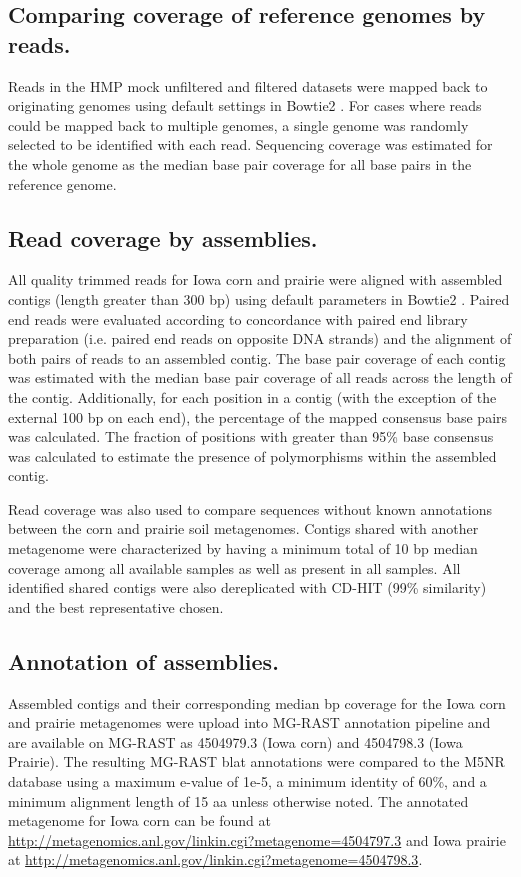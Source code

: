 \documentclass{pnastwo}
\begin{document}
\begin{article}
\subsection*{Comparing coverage of reference genomes by reads.}
Reads in the HMP mock unfiltered and filtered datasets were mapped
back to originating genomes using default settings in Bowtie2
\cite{bowtie}.  For cases where reads could be mapped back to multiple
genomes, a single genome was randomly selected to be identified with
each read.  Sequencing coverage was estimated for the whole genome as
the median base pair coverage for all base pairs in the reference
genome.

\subsection*{Read coverage by assemblies.}
All quality trimmed reads for Iowa corn and prairie were aligned with
assembled contigs (length greater than 300 bp) using default
parameters in Bowtie2 \cite{bowtie}.  Paired end reads were evaluated according to
concordance with paired end library preparation (i.e. paired end reads
on opposite DNA strands) and the alignment of both pairs of reads to
an assembled contig.  The base pair coverage of each contig was
estimated with the median base pair coverage of all reads across the
length of the contig.  Additionally, for each position in a contig
(with the exception of the external 100 bp on each end), the
percentage of the mapped consensus base pairs was calculated.  The
fraction of positions with greater than 95\% base consensus was
calculated to estimate the presence of polymorphisms within the
assembled contig.  

Read coverage was also used to compare sequences without known annotations between the corn and prairie soil metagenomes.  Contigs shared with another metagenome were characterized by 
having a minimum total of 10 bp median coverage among all available samples as well as present in all samples.  All identified shared contigs were also dereplicated with CD-HIT (99\% similarity) and the best representative chosen.

\subsection*{Annotation of assemblies.}
Assembled contigs and their corresponding median bp coverage for the
Iowa corn and prairie metagenomes were upload into MG-RAST annotation
pipeline \cite{Meyer:2008db} and are available on MG-RAST as 4504979.3 (Iowa corn)
and 4504798.3 (Iowa Prairie).  The resulting MG-RAST blat annotations
were compared to the M5NR database using a maximum e-value of 1e-5, a
minimum identity of 60\%, and a minimum alignment length of 15 aa unless otherwise noted.
The annotated metagenome for Iowa corn can be found at
\url{http://metagenomics.anl.gov/linkin.cgi?metagenome=4504797.3} and 
Iowa prairie at \url{http://metagenomics.anl.gov/linkin.cgi?metagenome=4504798.3}.
  

\end{article}
\end{document}
